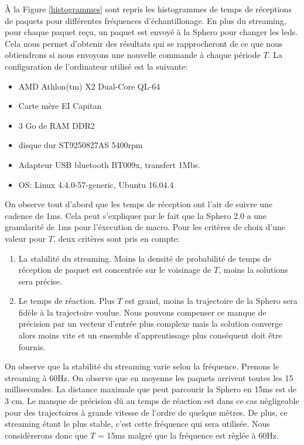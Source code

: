 À la Figure \ref{histogrammes} sont repris les histogrammes de temps de réceptions de paquets pour différentes fréquences d'échantillonage.
En plus du streaming, pour chaque paquet reçu, un paquet est envoyé à la Sphero pour changer les leds.
Cela nous permet d'obtenir des résultats qui se rapprocheront de ce que nous obtiendrons si nous envoyons une nouvelle commande à chaque période $T$.
La configuration de l'ordinateur utilisé est la suivante:
\begin{itemize}
 \item AMD Athlon(tm) X2 Dual-Core QL-64
 \item Carte mère EI Capitan
 \item 3 Go de RAM DDR2
 \item disque dur ST9250827AS 5400rpm
 \item Adapteur USB bluetooth BT009x, transfert 1Mbs.
 \item OS: Linux 4.4.0-57-generic, Ubuntu 16.04.4
\end{itemize}

On observe tout d'abord que les temps de réception ont l'air de suivre une cadence de 1ms.
Cela peut s'expliquer par le fait que la Sphero 2.0 a une granularité de 1ms pour l'éxecution de macro.\cite{product}
Pour les critères de choix d'une valeur pour $T$, deux critères sont pris en compte:
\begin{enumerate}
 \item La stabilité du streaming. Moins la densité de probabilité de temps de réception de paquet est concentrée sur le voisinage de $T$, moins la solutions sera précise.
 \item Le temps de réaction. Plus $T$ est grand, moins la trajectoire de la Sphero sera fidèle à la trajectoire voulue.
 Nous pouvons compenser ce manque de précision par un vecteur d'entrée plus complexe mais la solution converge alors moins vite et un ensemble d'apprentissage plus conséquent doit être fournis.
\end{enumerate}

On observe que la stabilité du streaming varie selon la fréquence.
Prenons le streaming à 60Hz. On observe que en moyenne les paquets arrivent toutes les 15 millisecondes.
La distance maximale que peut parcourir la Sphero en 15ms est de 3 cm.
Le manque de précision dû au temps de réaction est dans ce cas négligeable pour des trajectoires à grande vitesse de l'ordre de quelque mètres.
De plus, ce streaming étant le plus stable, c'est cette fréquence qui sera utilisée.
Nous considèrerons donc que $T$ = 15ms malgré que la fréquence est règlée à 60Hz.
